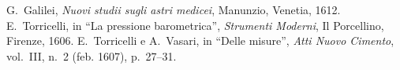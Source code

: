 \documentclass[%
12pt,
twoside,
]{toptesi}
\begin{document}
\begin{thebibliography}{9}
 G.~Galilei, {\em Nuovi studii sugli astri medicei}, Manunzio,
        Venetia, 1612.
 E.~Torricelli, in ``La pressione barometrica'', {\em Strumenti
        Moderni}, Il Porcellino, Firenze, 1606.
 E.~Torricelli e A.~Vasari, in ``Delle misure'', {\em Atti Nuovo
        Cimento}, vol.~III, n.~2 (feb. 1607), p.~27--31.
\end{thebibliography}
\end{document}
